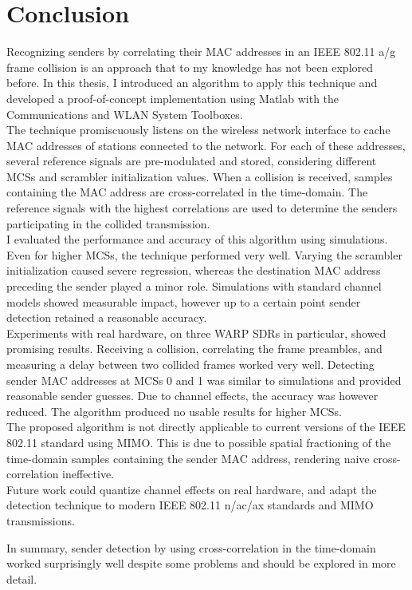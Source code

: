 
\chapter{Conclusion}\label{ch:Conclusion}
\glsresetall %
 

Recognizing senders by correlating their \gls{MAC} addresses in an IEEE 802.11 a/g frame collision is an approach that to my knowledge has not been explored before. In this thesis, I introduced an algorithm to apply this technique and developed a proof-of-concept implementation using Matlab with the Communications and WLAN System Toolboxes.\\

The technique promiscuously listens on the wireless network interface to cache \gls{MAC} addresses of stations connected to the network. For each of these addresses, several reference signals are pre-modulated and stored, considering different \glspl{MCS} and scrambler initialization values. When a collision is received, samples containing the \gls{MAC} address are cross-correlated in the time-domain. The reference signals with the highest correlations are used to determine the senders participating in the collided transmission.\\

I evaluated the performance and accuracy of this algorithm using simulations. Even for higher \glspl{MCS}, the technique performed very well. Varying the scrambler initialization caused severe regression, whereas the destination \gls{MAC} address preceding the sender played a minor role. Simulations with standard channel models showed measurable impact, however up to a certain point sender detection retained a reasonable accuracy.\\

Experiments with real hardware, on three \gls{WARP} \glspl{SDR} in particular, showed promising results. Receiving a collision, correlating the frame preambles, and measuring a delay between two collided frames worked very well. Detecting sender \gls{MAC} addresses at \glspl{MCS} 0 and 1 was similar to simulations and provided reasonable sender guesses. Due to channel effects, the accuracy was however reduced. The algorithm produced no usable results for higher \glspl{MCS}.\\

The proposed algorithm is not directly applicable to current versions of the IEEE 802.11 standard using \gls{MIMO}. This is due to possible spatial fractioning of the time-domain samples containing the sender \gls{MAC} address, rendering naive cross-correlation ineffective.\\

Future work could quantize channel effects on real hardware, and adapt the detection technique to modern IEEE 802.11 n/ac/ax standards and \gls{MIMO} transmissions.

In summary, sender detection by using cross-correlation in the time-domain worked surprisingly well despite some problems and should be explored in more detail.
